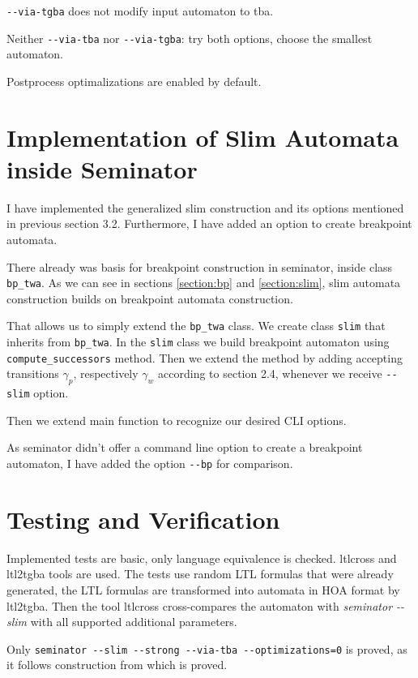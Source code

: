 \documentclass[
	digital,
nolof, nolot
]{fithesis3}
\begin{document}
		\texttt{-{}-via-tgba} does not modify input automaton to tba.
		
		Neither \texttt{-{}-via-tba} nor \texttt{-{}-via-tgba}: try both options, choose the smallest automaton.
		
		Postprocess optimalizations are enabled by default.
		
		
	\section{Implementation of Slim Automata inside Seminator}
	I have implemented the generalized slim construction and its options mentioned in previous section 3.2. Furthermore, I have added an option to create breakpoint automata.
	
	There already was basis for breakpoint construction in seminator, inside class \texttt{bp\_twa}.
	As we can see in sections \ref{section:bp} and \ref{section:slim}, slim automata construction builds on breakpoint automata construction.
	
	That allows us to simply extend the \texttt{bp\_twa} class.
	We create class \texttt{slim} that inherits from \texttt{bp\_twa}.
	In the \texttt{slim} class we build breakpoint automaton using \texttt{compute\_successors} method.
	Then we extend the method by adding accepting transitions $\gamma_p$, respectively $\gamma_w$ according to section 2.4, whenever we receive \texttt{-{}-slim} option.
	
	Then we extend main function to recognize our desired CLI options.
	
	As seminator didn't offer a command line option to create a breakpoint automaton, I have added the option \texttt{-{}-bp} for comparison.
	
	
	
	\section{Testing and Verification}
	Implemented tests are basic, only language equivalence is checked.
	ltlcross and ltl2tgba tools are used. The tests use random LTL formulas that were already generated, the LTL formulas are transformed into automata in HOA format by ltl2tgba.
	Then the tool ltlcross cross-compares the automaton with \emph{seminator -{}-slim} with all supported additional parameters.
	
	Only \texttt{seminator -{}-slim -{}-strong -{}-via-tba -{}-optimizations=0} is proved, as it follows construction from \cite{hlavni} which is proved.
	
\end{document}
